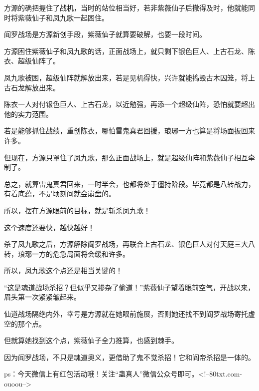 \begin{this_body}
方源的确把握住了战机，当时的站位相当好，若非紫薇仙子后撤得及时，他就能同时将紫薇仙子和凤九歌一起困住。

阎罗战场是方源新创手段，紫薇仙子就算要破解，也要一段时间。

方源困住紫薇仙子和凤九歌的话，正面战场上，就只剩下银色巨人、上古石龙、陈衣、超级仙阵了。

凤九歌被困，超级仙阵就解放出来，若是见机得快，兴许就能捣毁古木囚笼，将上古石龙解放出来。

陈衣一人对付银色巨人、上古石龙，以近勉强，再添一个超级仙阵，恐怕就要超出他的实力范围。

若是能够抓住战绩，重创陈衣，哪怕雷鬼真君回援，琅琊一方也算是将场面扳回来许多。

但现在，方源只罩住了凤九歌，那么正面战场上，就是超级仙阵和紫薇仙子相互牵制了。

总之，就算雷鬼真君回来，一时半会，也都将处于僵持阶段。毕竟都是八转战力，有着底蕴，不是顷刻间就会崩盘的。

所以，摆在方源眼前的目标，就是斩杀凤九歌！

这个速度还要快，越快越好！

杀了凤九歌之后，方源解除阎罗战场，再联合上古石龙、银色巨人对付天庭三大八转，琅琊一方的危急局面将会缓和许多。

所以，凤九歌这个点还是相当关键的！

“这是魂道战场杀招？但似乎又掺杂了偷道！”紫薇仙子望着眼前空气，开战以来，眉头第一次紧紧皱起来。

仙道战场隔绝内外，幸亏是方源就在她眼前施展，否则她还找不到阎罗战场寄托虚空的那个点。

但就算她找到这个点，紫薇仙子全力推算，也感到棘手。

因为阎罗战场，不只是魂道奥义，更借助了鬼不觉杀招！它和阎帝杀招是一体的。

ps：今天微信上有红包活动哦！关注“蛊真人”微信公众号即可。<!--80txt.com-ouoou-->

\end{this_body}

